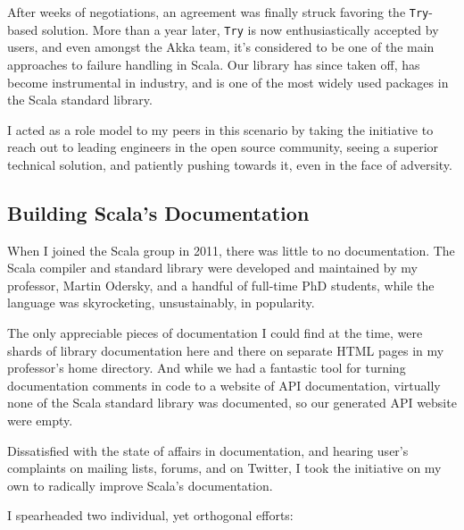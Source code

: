 \documentclass[acmtocl]{acmtrans2m}
\begin{document}
After weeks of negotiations, an agreement was finally struck favoring the
\verb|Try|-based solution. More than a year later, \verb|Try| is now
enthusiastically accepted by users, and even amongst the Akka team, it's
considered to be one of the main approaches to failure handling in Scala. Our
library has since taken off, has become instrumental in industry, and is one
of the most widely used packages in the Scala standard library.

I acted as a role model to my peers in this scenario by taking the initiative
to reach out to leading engineers in the open source community, seeing a
superior technical solution, and patiently pushing towards it, even in the
face of adversity.

\vspace{-0.1in}
\subsection*{\textbf{Building Scala's Documentation}}
\vspace{-0.1in}

When I joined the Scala group in 2011, there was little to no documentation.
The Scala compiler and standard library were developed and maintained by my
professor, Martin Odersky, and a handful of full-time PhD students, while the
language was skyrocketing, unsustainably, in popularity.

The only appreciable pieces of documentation I could find at the time, were
shards of library documentation here and there on separate HTML pages in my
professor's home directory. And while we had a fantastic tool for turning
documentation comments in code to a website of API documentation, virtually
none of the Scala standard library was documented, so our generated API
website were empty.

Dissatisfied with the state of affairs in documentation, and hearing user's
complaints on mailing lists, forums, and on Twitter, I took the initiative on
my own to radically improve Scala's documentation.

I spearheaded two individual, yet orthogonal efforts:
\end{document}
